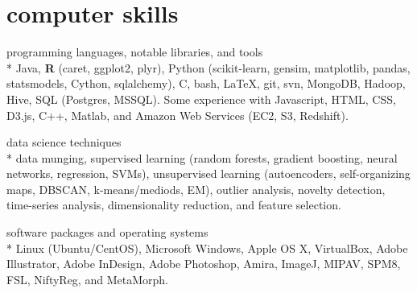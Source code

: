 \documentclass[print]{friggeri-cv} %
\begin{document}
\newpage
\section{computer skills}
\begin{description}
   \item {\smallheaderfont programming languages, notable libraries, and tools} \\*
        Java, \textbf{R} (caret, ggplot2, plyr), Python (scikit-learn, gensim,
        matplotlib, pandas, statsmodels, Cython, sqlalchemy), C, bash,
        \LaTeX, git, svn, MongoDB, Hadoop, Hive, SQL (Postgres,
        MSSQL). Some experience with Javascript, HTML, CSS, D3.js, C++,
        Matlab, and Amazon Web Services (EC2, S3, Redshift).
    \item {\smallheaderfont data science techniques} \\*
        data munging, supervised learning (random forests, gradient boosting,
        neural networks, regression, SVMs), unsupervised learning
        (autoencoders, self-organizing maps, DBSCAN, k-means/mediods, EM),
        outlier analysis, novelty detection, time-series analysis,
        dimensionality reduction, and feature selection.
    \item {\smallheaderfont software packages and operating systems} \\*
      Linux (Ubuntu/CentOS), Microsoft Windows, Apple OS X, VirtualBox, Adobe
      Illustrator, Adobe InDesign, Adobe Photoshop, Amira, ImageJ, MIPAV, SPM8,
      FSL, NiftyReg, and MetaMorph.
\end{description}
\end{document}
